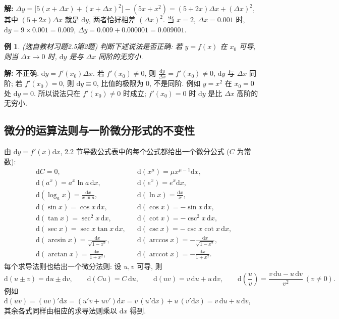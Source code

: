 \documentclass[UTF8,openany]{ctexbook}
\theoremstyle{chinesetextbook}
\newtheorem{example}{例}[section]
\newenvironment{cnsolution}{\par\indent\textbf{解:} \ignorespaces}{\par}
\newcommand{\dd}{\mathrm d}
\begin{document}
\begin{cnsolution}
$\Delta y=\bigl[5(x+\Delta x)+(x+\Delta x)^2\bigr]-(5x+x^2)=(5+2x)\Delta x+(\Delta x)^2$, 其中 $(5+2x)\Delta x$ 就是 $\dd y$, 两者恰好相差 $(\Delta x)^2$. 当 $x=2$, $\Delta x=0.001$ 时, $\dd y=9\times0.001=0.009$, $\Delta y=0.009+0.000001=0.009001$.
\end{cnsolution}
\begin{example}\label{ex:c2-h5-2}
\textnormal{(选自教材习题2.5第2题)} 判断下述说法是否正确: 若 $y=f(x)$ 在 $x_0$ 可导, 则当 $\Delta x\to0$ 时, $\dd y$ 是与 $\Delta x$ 同阶的无穷小.
\end{example}
\begin{cnsolution}
不正确. $\dd y=f'(x_0)\Delta x$. 若 $f'(x_0)\ne0$, 则 $\displaystyle\frac{\dd y}{\Delta x}=f'(x_0)\ne0$, $\dd y$ 与 $\Delta x$ 同阶; 若 $f'(x_0)=0$, 则 $\dd y\equiv0$, 比值的极限为 $0$, 不是同阶. 例如 $y=x^2$ 在 $x_0=0$ 处 $\dd y=0$. 所以说法只在 $f'(x_0)\ne0$ 时成立; $f'(x_0)=0$ 时 $\dd y$ 是比 $\Delta x$ 高阶的无穷小.
\end{cnsolution}
\subsection{微分的运算法则与一阶微分形式的不变性}
由 $\dd y=f'(x)\dd x$, 2.2 节导数公式表中的每个公式都给出一个微分公式 ($C$ 为常数):
\[
\begin{aligned}
&\dd C=0, &&\dd(x^\mu)=\mu x^{\mu-1}\dd x,\\
&\dd(a^x)=a^x\ln a\,\dd x, &&\dd(e^x)=e^x\dd x,\\
&\dd(\log_ax)=\frac{\dd x}{x\ln a}, &&\dd(\ln x)=\frac{\dd x}x,\\
&\dd(\sin x)=\cos x\,\dd x, &&\dd(\cos x)=-\sin x\,\dd x,\\
&\dd(\tan x)=\sec^2x\,\dd x, &&\dd(\cot x)=-\csc^2x\,\dd x,\\
&\dd(\sec x)=\sec x\tan x\,\dd x, &&\dd(\csc x)=-\csc x\cot x\,\dd x,\\
&\dd(\arcsin x)=\frac{\dd x}{\sqrt{1-x^2}}, &&\dd(\arccos x)=-\frac{\dd x}{\sqrt{1-x^2}},\\
&\dd(\arctan x)=\frac{\dd x}{1+x^2},\qquad &&\dd(\operatorname{arccot}x)=-\frac{\dd x}{1+x^2}.
\end{aligned}
\]
每个求导法则也给出一个微分法则: 设 $u,v$ 可导, 则
\[
\dd(u\pm v)=\dd u\pm\dd v,\qquad\dd(Cu)=C\,\dd u,\qquad\dd(uv)=v\,\dd u+u\,\dd v,\qquad\dd\left(\frac uv\right)=\frac{v\,\dd u-u\,\dd v}{v^2}\ (v\ne0).
\]
例如 $\dd(uv)=(uv)'\dd x=(u'v+uv')\dd x=v\,(u'\dd x)+u\,(v'\dd x)=v\,\dd u+u\,\dd v$, 其余各式同样由相应的求导法则乘以 $\dd x$ 得到.
\end{document}
